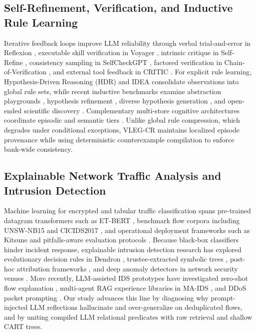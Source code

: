\documentclass[11pt,letterpaper,onecolumn]{article}
\begin{document}
\subsection{Self-Refinement, Verification, and Inductive Rule Learning}
Iterative feedback loops improve LLM reliability through verbal trial-and-error in Reflexion \cite{shinn2023reflexion}, executable skill verification in Voyager \cite{wang2024voyager}, intrinsic critique in Self-Refine \cite{madaan2023selfrefine}, consistency sampling in SelfCheckGPT \cite{manakul2023selfcheckgpt}, factored verification in Chain-of-Verification \cite{dhuliawala2024chain}, and external tool feedback in CRITIC \cite{gou2024critic}. For explicit rule learning, Hypothesis-Driven Reasoning (HDR) \cite{agarwal2026hypothesis} and IDEA \cite{he2024idea} consolidate observations into global rule sets, while recent inductive benchmarks examine abstraction playgrounds \cite{kim2022playgrounds}, hypothesis refinement \cite{qiu2024phenomenal}, diverse hypothesis generation \cite{lee2025generating}, and open-ended scientific discovery \cite{zhou2024hypothesis}. Complementary multi-store cognitive architectures coordinate episodic and semantic tiers \cite{kim2023machine,li2024memory,wang2025mirix}. Unlike global rule compression, which degrades under conditional exceptions, VLEG-CR maintains localized episode provenance while using deterministic counterexample compilation to enforce bank-wide consistency.

\subsection{Explainable Network Traffic Analysis and Intrusion Detection}
Machine learning for encrypted and tabular traffic classification spans pre-trained datagram transformers such as ET-BERT \cite{lin2022etbert}, benchmark flow corpora including UNSW-NB15 \cite{moustafa2015unsw} and CICIDS2017 \cite{sharafaldin2018cicids}, and operational deployment frameworks such as Kitsune \cite{mirsky2018kitsune} and pitfalls-aware evaluation protocols \cite{arp2022dos}. Because black-box classifiers hinder incident response, explainable intrusion detection research has explored evolutionary decision rules in Dendron \cite{papamartzivanos2018dendron}, trustee-extracted symbolic trees \cite{jacobs2022ai}, post-hoc attribution frameworks \cite{wei2023xaiids,charmet2022explainable}, and deep anomaly detectors in network security venues \cite{alissa2022botnet}. More recently, LLM-assisted IDS prototypes have investigated zero-shot flow explanation \cite{houssel2024explainable}, multi-agent RAG experience libraries in MA-IDS \cite{islam2026maids}, and DDoS packet prompting \cite{guastalla2024llmdos}. Our study advances this line by diagnosing why prompt-injected LLM reflections hallucinate and over-generalize on deduplicated flows, and by uniting compiled LLM relational predicates with raw retrieval and shallow CART trees.
\end{document}
